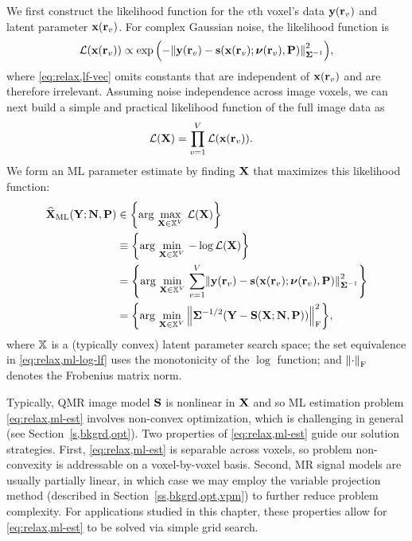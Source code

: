 We first construct the likelihood function
for the $v$th voxel's data $\bmy\paren{\bmr_v}$ 
and latent parameter $\bmx\paren{\bmr_v}$.
For complex Gaussian noise,
the likelihood function is
\begin{align}
	\Lf{\bmx\paren{\bmr_v}} \propto
	\expa{-\norm{\bmy\paren{\bmr_v}-
	\bms\paren{\bmx\paren{\bmr_v}; \bmnu\paren{\bmr_v}, \bmP}}^2_{\bmSig^{-1}}},
	\label{eq:relax,lf-vec}
\end{align}
where \eqref{eq:relax,lf-vec} omits constants
that are independent of $\bmx\paren{\bmr_v}$
and are therefore irrelevant.
Assuming noise independence 
across image voxels,
we can next build 
a simple and practical likelihood function
of the full image data as
\begin{align}
	\Lf{\bmX} &= \prod_{v=1}^V \Lf{\bmx\paren{\bmr_v}}.
	\label{eq:relax,lf-mtx}
\end{align}
We form an ML parameter estimate
by finding $\mathbf{X}$  
that maximizes this likelihood function:
\begin{align}
	\estaML{\bmX}{\bmY; \bmN, \bmP} &\in \set{\argmax{\bmX \in \setX^V} \Lf{\bmX}} 
	\nonumber \\
	&\equiv \set{\argmin{\bmX \in \setX^V} -\log{\Lf{\bmX}}}
	\label{eq:relax,ml-log-lf} \\
	&= \set{\argmin{\bmX \in \setX^V} 
	\sum_{v=1}^V \norm{\bmy\paren{\bmr_v} -
	\bms\paren{\bmx\paren{\bmr_v}; \bmnu\paren{\bmr_v}, \bmP}}^2_{\bmSig^{-1}}}
	\nonumber \\
	&= \set{\argmin{\bmX \in \setX^V} 
	\frob{\bmSig^{-1/2} \paren{\bmY - \bmS\paren{\bmX; \bmN, \bmP}}}^2},
	\label{eq:relax,ml-est}
\end{align}
where $\mathbb{X}$ is a (typically convex) latent parameter search space;
the set equivalence in \eqref{eq:relax,ml-log-lf} 
uses the monotonicity of the $\log$ function;
and $\frob{\cdot}$ denotes the Frobenius matrix norm.

Typically, 
QMR image model $\mathbf{S}$ is nonlinear in $\mathbf{X}$
and so ML estimation problem \eqref{eq:relax,ml-est}
involves non-convex optimization,
which is challenging in general
(see Section~\ref{s,bkgrd,opt}).
Two properties 
of \eqref{eq:relax,ml-est}
guide our solution strategies.
First, 
\eqref{eq:relax,ml-est} is separable across voxels,
so problem non-convexity is addressable 
on a voxel-by-voxel basis.
Second,
MR signal models are usually partially linear,
in which case we may employ the variable projection method 
(described in Section~\ref{ss,bkgrd,opt,vpm})
to further reduce problem complexity.
For applications studied
in this chapter,
these properties allow for \eqref{eq:relax,ml-est}
to be solved via simple grid search.
 
